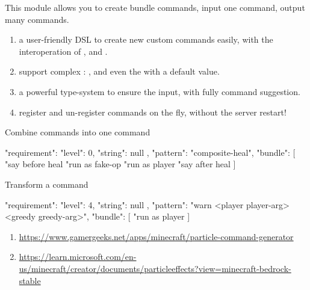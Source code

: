 
This module allows you to create bundle commands, input one command, output many commands.


\begin{enumerate}
    \item {a user-friendly DSL to create new custom commands easily, with the interoperation of ,  and .}
    \item {support complex : ,  and even the  with a default value.}
    \item {a powerful type-system to ensure the  input, with fully command suggestion.}
    \item {register and un-register commands on the fly, without the server restart!}
\end{enumerate}

\begin{example}{Combine commands into one command}
    \begin{json}
    {
        "requirement": {
        "level": 0,
        "string": null
    },
        "pattern": "composite-heal",
        "bundle": [
        "say before heal %
        "run as fake-op %
        "run as player %
        "say after heal %
        ]
    }
    \end{json}
\end{example}

\begin{example}{Transform a command}
    \begin{json}
    {
        "requirement": {
        "level": 4,
        "string": null
    },
        "pattern": "warn <player player-arg> <greedy greedy-arg>",
        "bundle": [
        "run as player %
        ]
    }
    \end{json}
\end{example}

\begin{enumerate}
    \item \url{https://www.gamergeeks.net/apps/minecraft/particle-command-generator}
    \item \url{https://learn.microsoft.com/en-us/minecraft/creator/documents/particleeffects?view=minecraft-bedrock-stable}
\end{enumerate}
